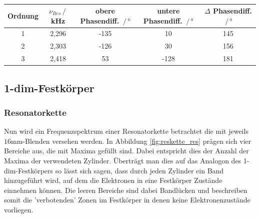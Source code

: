 \begin{table}
    \center
    \caption{}
    \begin{tabular}{c| c c c c}
        \toprule
        Ordnung & $\nu_{Res}\,/\,$kHz & obere Phasendiff. $\,/\,°$ & untere Phasendiff. $\,/\,°$ & $\Delta$ Phasendiff. $\,/\,°$\\
        \midrule
        1 &2,296 &-135 &10 &145 \\
        2 &2,303 &-126 &30 &156 \\
        3 &2,418 &53 &-128 &181 \\
        \bottomrule
    \end{tabular}
    \label{tab:mol_diff}
\end{table}
\newpage
\subsection{1-dim-Festkörper}
\subsubsection*{Resonatorkette}
Nun wird ein Frequenzspektrum einer Resonatorkette betrachtet die mit jeweils $16$mm-Blenden versehen werden.
In Abbildung \ref{fig:reskette_res} prägen sich vier Bereiche aus, die mit Maxima gefüllt sind. Dabei entspricht dies der Anzahl der Maxima der verwendeten Zylinder.
Überträgt man dies auf das Analogon des 1-dim-Festkörpers so lässt sich sagen, dass durch jeden Zylinder ein Band hinzugeführt wird, auf dem die Elektronen
in eine Festkörper Zustände einnehmen können. Die leeren Bereiche sind dabei Bandlücken und beschreiben somit die 'verbotenden' Zonen im Festkörper in denen keine Elektronenzustände vorliegen.



